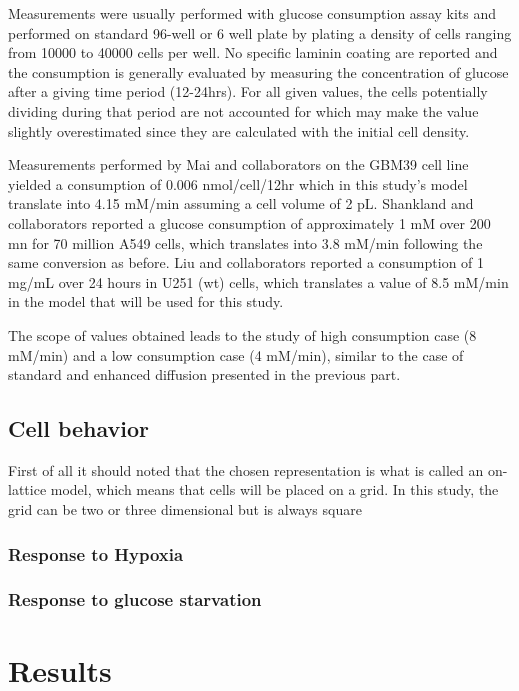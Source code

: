 \documentclass[11pt,a4paper]{article}
\begin{document}
Measurements were usually performed with glucose consumption assay kits and performed on standard 96-well or 6 well plate by plating a density of cells ranging from 10000 to 40000 cells per well. No specific laminin coating are reported and the consumption is generally evaluated by measuring the concentration of glucose after a giving time period (12-24hrs). For all given values, the cells potentially dividing during that period are not accounted for which may make  the value slightly overestimated since they are calculated with the initial cell density.\cite{Mai2017}\cite{Shankland2002}\cite{LiuFM2021}

Measurements performed by Mai and collaborators on the GBM39 cell line yielded a consumption of 0.006 nmol/cell/12hr which in this study's model translate into 4.15 mM/min assuming a cell volume of 2 pL.\cite{Mai2017} Shankland and collaborators reported a glucose consumption of approximately 1 mM over 200 mn for 70 million A549 cells, which translates into 3.8 mM/min following the same conversion as before. Liu and collaborators reported a consumption of 1 mg/mL over 24 hours in U251 (wt) cells, which translates a value of 8.5 mM/min in the model that will be used for this study.\cite{Liu2021}

The scope of values obtained leads to the study of high consumption case (8 mM/min) and a low consumption case (4 mM/min), similar to the case of standard and enhanced diffusion presented in the previous part. 
 

\subsection{Cell behavior}
First of all it should noted that the chosen representation is what is called an on-lattice model, which means that cells will be placed on a grid. In this study, the grid can be two or three dimensional but is always square 

\subsubsection{Response to Hypoxia}


\subsubsection{Response to glucose starvation}


\section{Results}

\newpage


\end{document}
